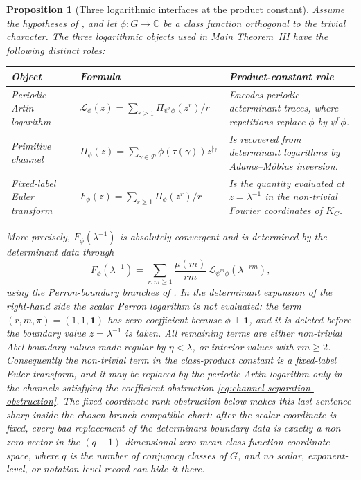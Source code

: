\documentclass[11pt,a4paper]{amsart}
\theoremstyle{plain}
\newtheorem{proposition}[theorem]{Proposition}
\theoremstyle{definition}
\theoremstyle{remark}
\newcommand{\CC}{\mathbb{C}}
\newcommand{\cP}{\mathcal P}
\begin{document}
\begin{proposition}[Three logarithmic interfaces at the product constant]
  \label{prop:three-logarithm-product-interface}
  Assume the hypotheses of , and let
  \(\phi:G\to\CC\) be a class function orthogonal to the trivial
  character.  The three logarithmic objects used in Main Theorem~III have
  the following distinct roles:
  \begin{center}
  \begin{tabular}{@{}L{0.25\textwidth}L{0.36\textwidth}L{0.29\textwidth}@{}}
  \toprule
  Object & Formula & Product-constant role \\
  \midrule
  Periodic Artin logarithm
  & \(\mathcal L_\phi(z)=\sum_{r\ge1}\Pi_{\psi^r\phi}(z^r)/r\)
  & Encodes periodic determinant traces, where repetitions replace
    \(\phi\) by \(\psi^r\phi\). \\
  Primitive channel
  & \(\Pi_\phi(z)=\sum_{\gamma\in\cP}\phi(\tau(\gamma))z^{|\gamma|}\)
  & Is recovered from determinant logarithms by Adams--M\"obius inversion. \\
  Fixed-label Euler transform
  & \(F_\phi(z)=\sum_{r\ge1}\Pi_\phi(z^r)/r\)
  & Is the quantity evaluated at \(z=\lambda^{-1}\) in the non-trivial
    Fourier coordinates of \(K_C\). \\
  \bottomrule
  \end{tabular}
  \end{center}
  More precisely, \(F_\phi(\lambda^{-1})\) is absolutely convergent and is
  determined by the determinant data through
  \begin{equation}\label{eq:three-logarithm-product-interface}
    F_\phi(\lambda^{-1})
    =
    \sum_{r,m\ge1}\frac{\mu(m)}{rm}\,
      \mathcal L_{\psi^m\phi}(\lambda^{-rm}),
  \end{equation}
  using the Perron-boundary branches of .
  In the determinant expansion of the right-hand side the scalar Perron
  logarithm is not evaluated: the term \((r,m,\pi)=(1,1,\mathbf1)\) has zero
  coefficient because \(\phi\perp\mathbf1\), and it is deleted before the
  boundary value \(z=\lambda^{-1}\) is taken.  All remaining terms are either
  non-trivial Abel-boundary values made regular by \(\eta<\lambda\), or
  interior values with \(rm\ge2\).
  Consequently the non-trivial term in the class-product constant is a
  fixed-label Euler transform, and it may be replaced by the periodic
  Artin logarithm only in the channels satisfying the coefficient
  obstruction \eqref{eq:channel-separation-obstruction}.
  The fixed-coordinate rank obstruction
   below makes this
  last sentence sharp inside the chosen branch-compatible chart: after the
  scalar coordinate is fixed, every bad replacement of the determinant
  boundary data is exactly a non-zero vector in the \((q-1)\)-dimensional
  zero-mean class-function coordinate space, where \(q\) is the number of
  conjugacy classes of \(G\), and no scalar, exponent-level, or
  notation-level record can hide it there.
\end{proposition}
\end{document}
